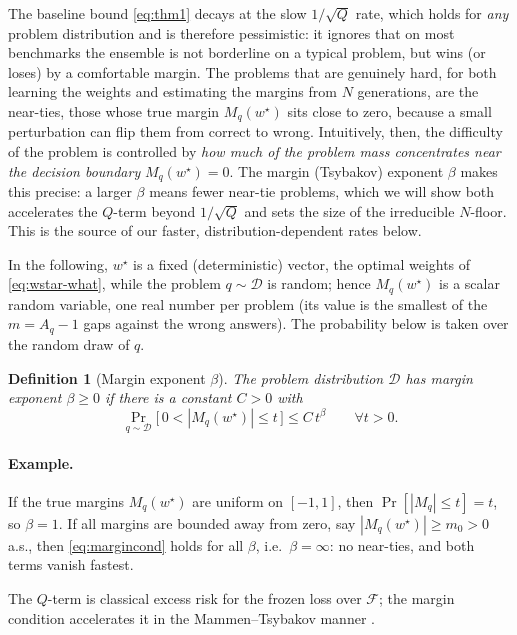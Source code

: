 \documentclass{article} %
\newtheorem{definition}{Definition}
\providecommand{\D}{\mathcal{D}}
\providecommand{\Fcal}{\mathcal{F}}
\providecommand{\wstar}{w^{\star}}
\begin{document}
The baseline bound \eqref{eq:thm1} decays at the slow $1/\sqrt Q$ rate, which
holds for \emph{any} problem distribution and is therefore pessimistic: it
ignores that on most benchmarks the ensemble is not borderline on a typical
problem, but wins (or loses) by a comfortable margin. The problems that are
genuinely hard, for both learning the weights and estimating the margins from
$N$ generations, are the near-ties, those whose true margin $M_q(\wstar)$ sits
close to zero, because a small perturbation can flip them from correct to wrong.
Intuitively, then, the difficulty of the problem is controlled by \emph{how much
of the problem mass concentrates near the decision boundary} $M_q(\wstar)=0$. The
margin (Tsybakov) exponent $\beta$ makes this precise: a larger $\beta$ means
fewer near-tie problems, which we will show both accelerates the $Q$-term beyond
$1/\sqrt Q$ and sets the size of the irreducible $N$-floor. This is the source of
our faster, distribution-dependent rates below.

In the following, $\wstar$ is a fixed (deterministic) vector, the optimal weights
of \eqref{eq:wstar-what}, while the problem $q\sim\D$ is random; hence
$M_q(\wstar)$ is a scalar random variable, one real number per problem (its value
is the smallest of the $m=A_q-1$ gaps against the wrong answers). The probability
below is taken over the random draw of $q$.
\begin{definition}[Margin exponent $\beta$]
\label{def:tsybakov}
The problem distribution $\D$ has margin exponent $\beta\ge 0$ if there is a
constant $C>0$ with
\begin{equation}
\label{eq:margincond}
\Pr_{q\sim\D}\!\big[\,0 < |M_q(\wstar)| \le t\,\big] \le C\,t^{\beta}
\qquad \forall t>0.
\end{equation}
\end{definition}

\paragraph{Example.}
If the true margins $M_q(\wstar)$ are uniform on $[-1,1]$, then
$\Pr[|M_q|\le t] = t$, so $\beta=1$. If all margins are bounded away from zero,
say $|M_q(\wstar)|\ge m_0>0$ a.s., then \eqref{eq:margincond} holds for all
$\beta$, i.e.\ $\beta=\infty$: no near-ties, and both terms vanish fastest.

The $Q$-term is classical excess risk for the frozen loss over $\Fcal$; the
margin condition accelerates it in the Mammen--Tsybakov manner
\citep{mammen1999smooth,tsybakov2004optimal}.
\end{document}
